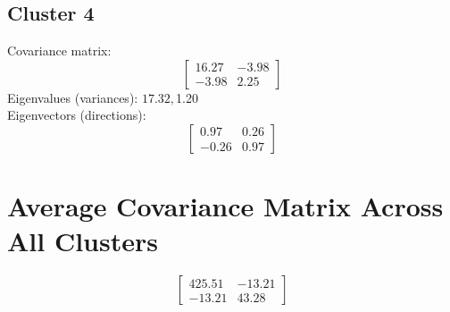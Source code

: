 \documentclass{article}
\begin{document}
\subsection*{Cluster 4}
Covariance matrix:
\[\begin{bmatrix}16.27 & -3.98 \\-3.98 & 2.25\end{bmatrix}\]
Eigenvalues (variances): $ 17.32, $1.20\\
Eigenvectors (directions):
\[\begin{bmatrix}0.97 & 0.26 \\-0.26 & 0.97\end{bmatrix}\]
\section*{Average Covariance Matrix Across All Clusters}
\[\begin{bmatrix}425.51 & -13.21 \\-13.21 & 43.28\end{bmatrix}\]
\end{document}
